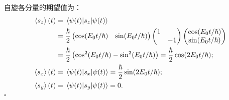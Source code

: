 \begin{tcolorbox}[breakable, title={\textbf{例题}}]
    自旋各分量的期望值为：
    \begin{equation}
    \begin{aligned}
        \expval{s_z}(t) &= \mel{\psi(t)}{s_z}{\psi(t)} \\
        &= \frac{\hbar}{2} \begin{pmatrix} \cos(E_0 t/\hbar) & \sin(E_0 t/\hbar) \end{pmatrix} \begin{pmatrix} 1 & \\ & -1 \end{pmatrix} \begin{pmatrix} \cos(E_0 t/\hbar) \\ \sin(E_0 t/\hbar) \end{pmatrix} \\
        &= \frac{\hbar}{2} \left(\cos^2(E_0 t/\hbar) - \sin^2(E_0 t/\hbar)\right)
        = \frac{\hbar}{2} \cos(2E_0 t/\hbar); \\
        \expval{s_x}(t) &= \mel{\psi(t)}{s_x}{\psi(t)} = \frac{\hbar}{2} \sin(2E_0 t/\hbar); \\
        \expval{s_y}(t) &= \mel{\psi(t)}{s_y}{\psi(t)} = 0.
    \end{aligned}
    \end{equation}
    \hfill $\square$
\end{tcolorbox}
